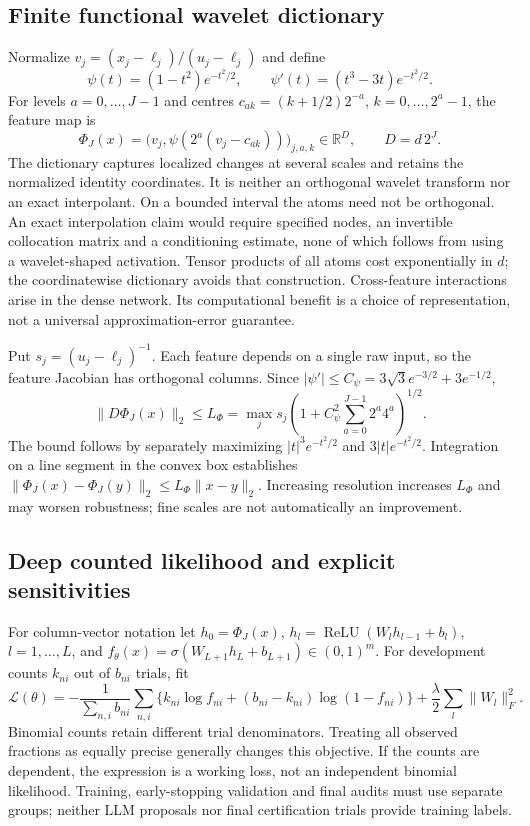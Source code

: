 \subsection{Finite functional wavelet dictionary}
Normalize $v_j=(x_j-\ell_j)/(u_j-\ell_j)$ and define
\begin{equation}
 \psi(t)=(1-t^2)e^{-t^2/2},\qquad
 \psi'(t)=(t^3-3t)e^{-t^2/2}.
\end{equation}
For levels $a=0,\ldots,J-1$ and centres
$c_{ak}=(k+1/2)2^{-a}$, $k=0,\ldots,2^a-1$, the feature map is
\begin{equation}
 \Phi_J(x)=\big(v_j,\psi(2^a(v_j-c_{ak}))\big)_{j,a,k}
 \in\mathbb R^{D},\qquad D=d\,2^J.
\end{equation}
The dictionary captures localized changes at several scales and retains the
normalized identity coordinates. It is neither an orthogonal wavelet transform
nor an exact interpolant. On a bounded interval the atoms need not be orthogonal.
An exact interpolation claim would require specified nodes, an invertible
collocation matrix and a conditioning estimate, none of which follows from
using a wavelet-shaped activation. Tensor products of all atoms cost
exponentially in $d$; the coordinatewise dictionary avoids that construction.
Cross-feature interactions arise in the dense network. Its computational benefit
is a choice of representation, not a universal approximation-error guarantee.

Put $s_j=(u_j-\ell_j)^{-1}$. Each feature depends on a single raw input, so the
feature Jacobian has orthogonal columns. Since
$|\psi'|\le C_\psi=3\sqrt3 e^{-3/2}+3e^{-1/2}$,
\begin{equation}
 \|D\Phi_J(x)\|_2\le L_\Phi=
 \max_j s_j\left(1+C_\psi^2\sum_{a=0}^{J-1}2^a4^a\right)^{1/2}.
\end{equation}
The bound follows by separately maximizing $|t|^3e^{-t^2/2}$ and
$3|t|e^{-t^2/2}$. Integration on a line segment in the convex box establishes
$\|\Phi_J(x)-\Phi_J(y)\|_2\le L_\Phi\|x-y\|_2$.
Increasing resolution increases $L_\Phi$ and may worsen robustness; fine scales
are not automatically an improvement.

\subsection{Deep counted likelihood and explicit sensitivities}
For column-vector notation let $h_0=\Phi_J(x)$,
$h_l=\operatorname{ReLU}(W_lh_{l-1}+b_l)$, $l=1,\ldots,L$, and
$f_\theta(x)=\sigma(W_{L+1}h_L+b_{L+1})\in(0,1)^m$.
For development counts $k_{ni}$ out of $b_{ni}$ trials, fit
\begin{equation}
 \mathcal L(\theta)= -\frac{1}{\sum_{n,i}b_{ni}}
 \sum_{n,i}\{k_{ni}\log f_{ni}+(b_{ni}-k_{ni})\log(1-f_{ni})\}
 +\frac\lambda2\sum_l\|W_l\|_F^2.
\end{equation}
Binomial counts retain different trial denominators. Treating all observed
fractions as equally precise generally changes this objective. If the counts
are dependent, the expression is a working loss, not an independent binomial
likelihood. Training, early-stopping validation and final audits must use
separate groups; neither LLM proposals nor final certification trials provide
training labels.

